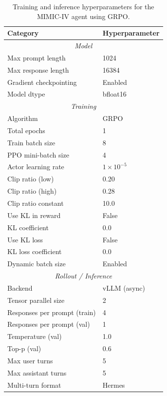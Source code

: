 \begin{table}[t]
\centering
\small
\begin{tabular}{ll}
\toprule
\textbf{Category} & \textbf{Hyperparameter} \\
\midrule

\multicolumn{2}{c}{\textit{Model}} \\
Max prompt length & 1024 \\
Max response length & 16384 \\
Gradient checkpointing & Enabled \\
Model dtype & bfloat16 \\

\midrule
\multicolumn{2}{c}{\textit{Training}} \\
Algorithm & GRPO \\
Total epochs & 1 \\
Train batch size & 8 \\
PPO mini-batch size & 4 \\
Actor learning rate & $1 \times 10^{-5}$ \\
Clip ratio (low) & 0.20 \\
Clip ratio (high) & 0.28 \\
Clip ratio constant & 10.0 \\
Use KL in reward & False \\
KL coefficient & 0.0 \\
Use KL loss & False \\
KL loss coefficient & 0.0 \\
Dynamic batch size & Enabled \\

\midrule
\multicolumn{2}{c}{\textit{Rollout / Inference}} \\
Backend & vLLM (async) \\
Tensor parallel size & 2 \\
Responses per prompt (train) & 4 \\
Responses per prompt (val) & 1 \\
Temperature (val) & 1.0 \\
Top-p (val) & 0.6 \\
Max user turns & 5 \\
Max assistant turns & 5 \\
Multi-turn format & Hermes \\

\bottomrule
\end{tabular}
\caption{Training and inference hyperparameters for the MIMIC-IV agent using GRPO.}
\label{tab:hyperparams}
\end{table}

